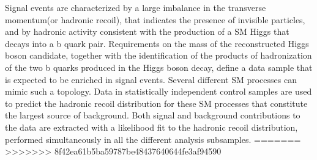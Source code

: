 Signal events are characterized by a large imbalance in the transverse
momentum(or hadronic recoil), that indicates the presence of invisible
particles, and by hadronic activity consistent with the production of
a SM Higgs that decays into a b quark pair. Requirements on the mass
of the reconstructed Higgs boson candidate, together with the
identification of the products of hadronization of the two b quarks
produced in the Higgs boson decay, define a data sample that is
expected to be enriched in signal events. Several different SM
processes can mimic such a topology. Data in statistically independent control samples are used to predict the hadronic recoil distribution for these SM processes that constitute the largest source of background.
Both signal and background contributions to the data are extracted with a likelihood fit to the hadronic recoil distribution, performed simultaneously in all the different analysis subsamples.
=======
>>>>>>> 8f42ea61b5ba59787be48437640644fe3af94590
